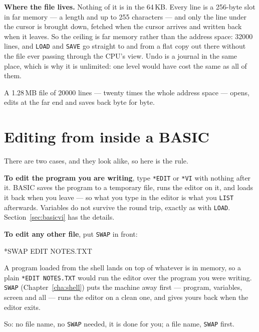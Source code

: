 \begin{aside}
\textbf{Where the file lives.} Nothing of it is in the 64\,KB. Every line
is a 256-byte slot in far memory --- a length and up to 255 characters ---
and only the line under the cursor is brought down, fetched when the
cursor arrives and written back when it leaves. So the ceiling is far
memory rather than the address space: 32000 lines, and \verb|LOAD| and
\verb|SAVE| go straight to and from a flat copy out there without the file
ever passing through the CPU's view. Undo is a journal in the same
place, which is why it is unlimited: one level would have cost the same
as all of them.

A 1.28\,MB file of 20000 lines --- twenty times the whole address space
--- opens, edits at the far end and saves back byte for byte.
\end{aside}

\section{Editing from inside a BASIC}\label{sec:editfrombasic}
There are two cases, and they look alike, so here is the rule.

\textbf{To edit the program you are writing}, type \verb|*EDIT| or
\verb|*VI| with nothing after it. BASIC saves the program to a temporary
file, runs the editor on it, and loads it back when you leave --- so what
you type in the editor is what you \verb|LIST| afterwards. Variables do
not survive the round trip, exactly as with \verb|LOAD|.
Section~\ref{sec:basicvi} has the details.

\textbf{To edit any other file}, put \verb|SWAP| in front:

\begin{type}
*SWAP EDIT NOTES.TXT
\end{type}

\noindent A program loaded from the shell lands on top of whatever is in
memory, so a plain \verb|*EDIT NOTES.TXT| would run the editor over the
program you were writing. \verb|SWAP| (Chapter~\ref{cha:shell}) puts the
machine away first --- program, variables, screen and all --- runs the
editor on a clean one, and gives yours back when the editor exits.

So: no file name, no \verb|SWAP| needed, it is done for you; a file name,
\verb|SWAP| first.
